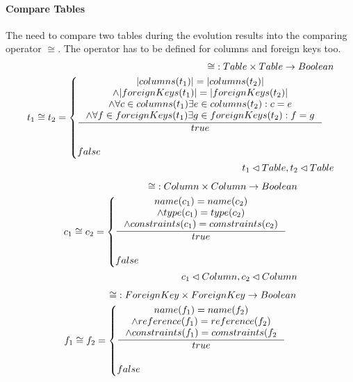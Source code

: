 \documentclass[11pt]{article}
\begin{document}
\paragraph{Compare Tables} The need to compare two tables during the evolution results into the comparing operator $\cong$. The operator has to be defined for columns and foreign keys too.
\begin{align*}
	\mathbf{\cong} : Table \times Table \rightarrow Boolean \\
	t_1 \cong t_2 = \begin{cases}
 		\inference{|columns(t_1)| = |columns(t_2)| \\ \wedge |foreignKeys(t_1)| = |foreignKeys(t_2)| \\ \wedge \forall c \in columns(t_1) \exists e \in columns(t_2) : c = e \\ \wedge \forall f \in foreignKeys(t_1) \exists g \in foreignKeys(t_2) : f = g }{true}\\\\
 false
 \end{cases}\\
 t_1 \lhd Table, t_2 \lhd Table
\end{align*}
\begin{align*}
	\mathbf{\cong} : Column \times Column \rightarrow Boolean \\
	c_1 \cong c_2 = \begin{cases}
 		\inference{name(c_1) = name(c_2) \\ \wedge type(c_1) = type(c_2) \\ \wedge constraints(c_1) = comstraints(c_2)}{true}
 		\\ \\
		false
 \end{cases}\\
 c_1 \lhd Column, c_2 \lhd Column
\end{align*}
\begin{align*}
	\mathbf{\cong} : ForeignKey \times ForeignKey \rightarrow Boolean \\
	f_1 \cong f_2 = \begin{cases}
 		\inference{name(f_1) = name(f_2) \\ \wedge reference(f_1) = reference(f_2) \\ \wedge constraints(f_1) = comstraints(f_2}{true}
 		\\ \\
		false
 \end{cases}
\end{align*}
\end{document}
